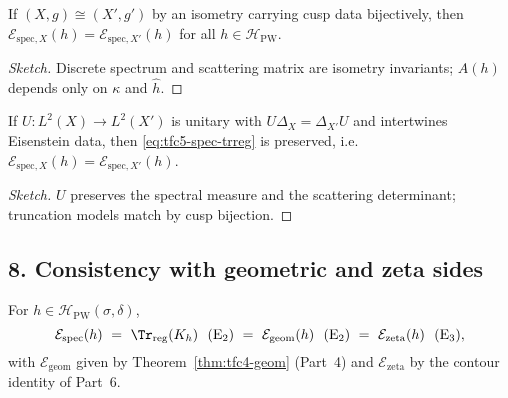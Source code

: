 \begin{proposition}\relax\hspace{0pt}
\label{prop:tfc5-isometry} %
If $(X,g)\cong (X',g')$ by an isometry carrying cusp data bijectively, then $\mathcal{E}_{\mathrm{spec},X}(h)=\mathcal{E}_{\mathrm{spec},X'}(h)$ for all $h\in\mathcal{H}_{\mathrm{PW}}$. \relax\hspace{0pt}
\end{proposition}

\begin{proof}[Sketch]\relax\hspace{0pt}
Discrete spectrum and scattering matrix are isometry invariants; $A(h)$ depends only on $\kappa$ and $\widehat{h}$. \relax\hspace{0pt}
\end{proof}

\begin{proposition}\relax\hspace{0pt}
\label{prop:tfc5-unitary} %
If $U:L^2(X)\to L^2(X')$ is unitary with $U\Delta_X=\Delta_{X'}U$ and intertwines Eisenstein data, then \eqref{eq:tfc5-spec-trreg} is preserved, i.e.\ $\mathcal{E}_{\mathrm{spec},X}(h)=\mathcal{E}_{\mathrm{spec},X'}(h)$. \relax\hspace{0pt}
\end{proposition}

\begin{proof}[Sketch]\relax\hspace{0pt}
$U$ preserves the spectral measure and the scattering determinant; truncation models match by cusp bijection. \relax\hspace{0pt}
\end{proof}

\subsection*{8. Consistency with geometric and zeta sides}\relax\hspace{0pt}
\label{subsec:tfc5-consistency} %

\begin{theorem}[Channel equivalence $\mathrm{E}_1=\mathrm{E}_2=\mathrm{E}_3$ (spectral focus)]\relax\hspace{0pt}
\label{thm:tfc5-E123} %
For $h\in\mathcal{H}_{\mathrm{PW}}(\sigma,\delta)$,
\[
\mathcal{E}_{\mathrm{spec}}(h)\ =\ \Tr_{\mathrm{reg}}(K_h)\ \ (\mathrm{E}_2)\ =\ \mathcal{E}_{\mathrm{geom}}(h)\ \ (\mathrm{E}_2)\ =\ \mathcal{E}_{\mathrm{zeta}}(h)\ \ (\mathrm{E}_3),
\]
with $\mathcal{E}_{\mathrm{geom}}$ given by Theorem~\ref{thm:tfc4-geom} (Part~4) and $\mathcal{E}_{\mathrm{zeta}}$ by the contour identity of Part~6. \relax\hspace{0pt}
\end{theorem}

